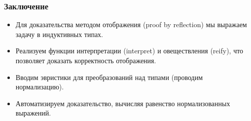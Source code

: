 \documentclass{beamer}
\begin{document}
\begin{frame}
  \frametitle{Заключение}
  \begin{itemize}
  \item Для доказательства методом отображения (proof by reflection) мы выражаем задачу в индуктивных типах.
  \item Реализуем функции интерпретации (interpret) и овеществления (reify), что позволяет доказать корректность отображения.
  \item Вводим эвристики для преобразований над типами (проводим нормализацию).
  \item Автоматизируем доказательство, вычисляя равенство нормализованных выражений.
  \end{itemize}
\end{frame}
\end{document}
